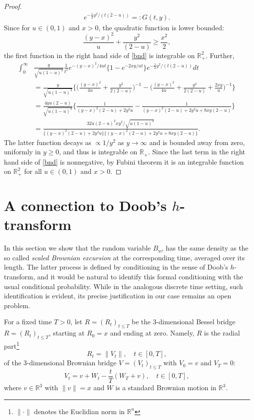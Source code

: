 \documentclass[reqno,10pt]{amsart}
\theoremstyle{definition}
\theoremstyle{remark}
\numberwithin{equation}{section}
\begin{document}
\begin{proof}
\begin{multline}
e^{-\frac 1 2 y^2/(t(2-u))}=:G(t,y).
\end{multline}
Since for $u\in(0,1)$ and $x>0$, the quadratic function is lower bounded:
$$
\frac{(y-x)^2}{u}+ \frac{y^2}{(2-u)}\ge  \frac{x^2}{2},
$$
the first function in the right hand side of \eqref{bnd} is
integrable on ${\mathbb R}_+^2$.
Further,
\begin{align*}
\int_0^\infty &\frac{y}{\sqrt{u(1-u)^3}}\frac{1}{ t^2}
e^{-(y-x)^2/4u t}\bigg\{
1-e^{-2xy/u t}\bigg\}
e^{-\frac 1 2 y^2/(t(2-u))}dt\\
&=\frac{y}{\sqrt{u(1-u)^3}}
\bigg\{
\bigg(
\frac{(y-x)^2}{4u}+
\frac{ y^2}{2(2-u)}
\bigg)^{-1}-
\bigg(
\frac{(y-x)^2}{4u}+
\frac{ y^2}{2(2-u)}+
\frac{2xy}{u}
\bigg)^{-1}
\bigg\}
\\
&=
\frac{4yu(2-u)}{\sqrt{u(1-u)^3}}
\bigg\{
\frac{1}{(y-x)^2(2-u)+2y^2u}
-
\frac{1}{(y-x)^2(2-u)+2y^2u+8xy(2-u)}
\bigg\}
\\
&=\frac{32u(2-u)^2 xy^2/\sqrt{u(1-u)^3}}{\Big\{(y-x)^2(2-u)+2y^2u\Big\}\Big\{(y-x)^2(2-u)+2y^2u+8xy(2-u)\Big\}}.
\end{align*}
The latter function decays as $\propto 1/y^2$ as $y\to\infty$ and is bounded away from zero, uniformly in $y\ge 0$,
and thus is integrable on ${\mathbb R}_+$. Since the last term in the right hand side of \eqref{bnd} is nonnegative,
by Fubini theorem it is an integrable function on ${\mathbb R}_+^2$ for all $u\in (0,1)$ and $x>0$.
\end{proof}

\section{A connection to Doob's $h$-transform}\label{sec-3}

In this section we show that the random variable $B_{u\tau}$ has the same
density as the so called {\em scaled Brownian excursion} at the corresponding time, averaged over its length.
The latter process is defined by conditioning in the sense of Doob's $h$-transform, and it would be natural
to identify this formal conditioning with the usual conditional probability.
While in the analogous discrete time setting, such identification is evident, its precise justification
in our case remains an open problem.

For a fixed time $T>0$, let $R=(R_t)_{t\le T}$ be the 3-dimensional Bessel bridge $R=(R_t)_{t\le T}$, starting at $R_0=x$ and
ending at zero. Namely, $R$ is the radial part\footnote{$\|\cdot\|$ denotes the Euclidian norm in ${\mathbb R}^n$}
\begin{equation}\label{R}
R_t = \|V_t\|, \quad t\in[0,T],
\end{equation}
of the 3-dimensional Brownian bridge $V=(V_t)_{t\le T}$ with $V_0=v$ and $V_T=0$:
$$
V_t = v+W_t-\frac t T(W_T+v), \quad t\in [0,T],
$$
where  $v\in\mathbb{R}^3$ with $\|v\|=x$ and  $W$ is a standard Brownian motion in
$\mathbb{R}^3$.
\end{document}
